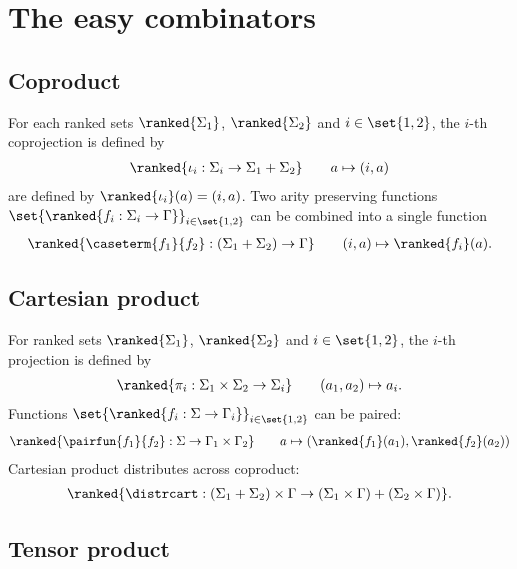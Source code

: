 \section{The easy combinators}


\subsection{Coproduct}
For each  ranked sets $\ranked{\Sigma_1}$, $\ranked{\Sigma_2}$  and $i \in \set{1,2}$, the $i$-th coprojection is defined by  
       \begin{align*}
           \ranked{\iota_i : \Sigma_i \to \Sigma_1 + \Sigma_2} \qquad   a \mapsto  (i,a)
       \end{align*}
       are defined by $\ranked{\iota_i}(a)= (i,a)$. Two arity preserving functions $\set{\ranked{f_i : \Sigma_i \to \Gamma}}_{i \in \set{1,2}}$ can be combined into a single function 
       \begin{align*}
           \ranked{\caseterm{f_1}{f_2} : (\Sigma_1 + \Sigma_2) \to \Gamma} \qquad (i,a) \mapsto \ranked{f_i}(a).
       \end{align*}
       
  
\subsection{Cartesian product}
For   ranked sets $\ranked{\Sigma_1}$, $\ranked{\Sigma_2}$ and $i \in \set{1,2}$, the $i$-th projection is defined by 
       \begin{align*}
           \ranked{\pi_i : \Sigma_1 \times \Sigma_2  \to \Sigma_i} \qquad (a_1,a_2) \mapsto a_i.
       \end{align*}
 Functions $\set{\ranked{f_i : \Sigma \to \Gamma_i}}_{i \in \set{1,2}}$ can be paired: 
       \begin{align*}
           \ranked{\pairfun{f_1}{f_2} : \Sigma \to  \Gamma_1 \times \Gamma_2} \qquad a \mapsto (\ranked{f_1}(a_1),\ranked{f_2}(a_2))
       \end{align*}
 Cartesian  product distributes across coproduct:
       \begin{align*}
           \ranked{\distrcart : (\Sigma_1 + \Sigma_2)\times \Gamma \to (\Sigma_1 \times \Gamma) + (\Sigma_2 \times \Gamma)}.
       \end{align*}
  
\subsection{Tensor product}

